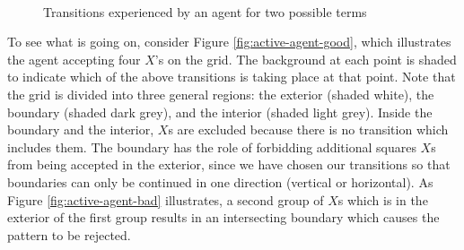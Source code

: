 \documentclass[12pt]{amsbook}
\theoremstyle{plain}
\theoremstyle{definition}
\theoremstyle{remark}
\begin{document}
\begin{figure}
\\
\caption{Transitions experienced by an agent for two possible terms}
\end{figure}

To see what is going on, consider Figure \ref{fig:active-agent-good}, which illustrates the agent accepting four $X$'s on the grid.  The background at each point is shaded to indicate which of the above transitions is taking place at that point.  Note that the grid is divided into three general regions:  the exterior (shaded white), the boundary (shaded dark grey), and the interior (shaded light grey).  Inside the boundary and the interior, $X$s are excluded because there is no transition which includes them.  The boundary has the role of forbidding additional squares $X$s from being accepted in the exterior, since we have chosen our transitions so that boundaries can only be continued in one direction (vertical or horizontal).  As Figure \ref{fig:active-agent-bad} illustrates, a second group of $X$s which is in the exterior of the first group results in an intersecting boundary which causes the pattern to be rejected.
\end{document}
